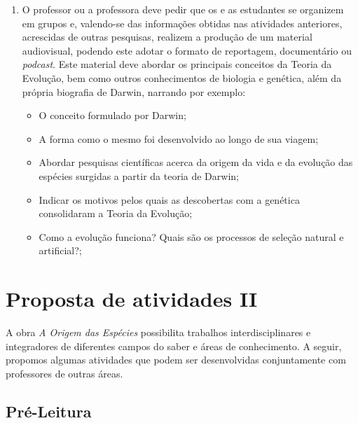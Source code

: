 \documentclass[11pt]{extarticle}
\begin{document}
\begin{enumerate}

	\item
	O professor ou a professora deve pedir que os e as estudantes se organizem em grupos e,
	valendo-se das informações obtidas nas atividades anteriores,
	acrescidas de outras pesquisas, realizem a produção de um material audiovisual,
	podendo este adotar o formato de reportagem, documentário ou \textit{podcast}. Este
	material deve abordar os principais conceitos da Teoria da Evolução, bem como
	outros conhecimentos de biologia e genética, além da própria biografia de
	Darwin, narrando por exemplo:

\begin{itemize} \item O conceito formulado por Darwin; \item A forma como
    o mesmo foi desenvolvido ao longo de sua viagem; \item Abordar pesquisas
    científicas acerca da origem da vida e da evolução das espécies surgidas
    a partir da teoria de Darwin; \item Indicar os motivos pelos quais as
 	descobertas com a genética consolidaram a Teoria da Evolução; \item Como
	a evolução funciona? Quais são os processos de seleção natural e artificial?; 
	


\end{itemize}

\end{enumerate}


\section{Proposta de atividades II}

A obra \emph{A Origem das Espécies} possibilita trabalhos interdisciplinares
e integradores de diferentes campos do saber e áreas de conhecimento. A seguir,
propomos algumas atividades que podem ser desenvolvidas conjuntamente com
professores de outras áreas. 

\subsection{Pré-Leitura}
\end{document}
